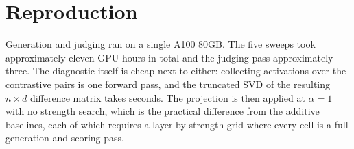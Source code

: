 \section{Reproduction}
\label{app:repro}

Generation and judging ran on a single A100 80GB. The five sweeps took approximately
eleven GPU-hours in total and the judging pass approximately three. The diagnostic
itself is cheap next to either: collecting activations over the contrastive pairs is one
forward pass, and the truncated SVD of the resulting $n \times d$ difference matrix takes
seconds. The projection is then applied at $\alpha{=}1$ with no strength search, which is
the practical difference from the additive baselines, each of which requires a
layer-by-strength grid where every cell is a full generation-and-scoring pass.


